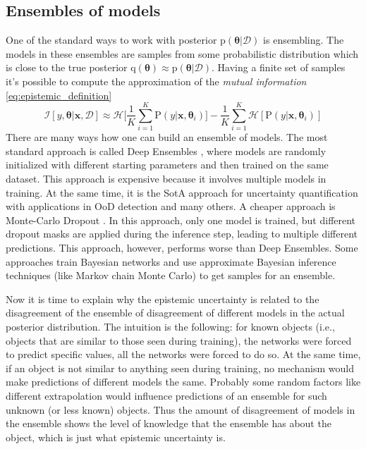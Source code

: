 \documentclass{article}
\begin{document}
\subsection{Ensembles of models}
One of the standard ways to work with posterior $\mathrm{p} (\boldsymbol{\theta} | \mathcal{D})$ is ensembling.
The models in these ensembles are samples from some probabilistic distribution which is close to the true posterior $\mathrm{q} (\boldsymbol{\theta}) \approx \mathrm{p} (\boldsymbol{\theta} | \mathcal{D})$. Having a finite set of samples it's possible to compute the approximation of the \textit{mutual information} \eqref{eq:epistemic_definition}
\begin{equation}
\mathcal{I}[ y, \boldsymbol{\theta} | \boldsymbol{x}, \mathcal{D} ] \approx \mathcal{H} \Bigg[ \frac{1}{K} \sum\limits_{i=1}^K \mathrm{P} (y | \boldsymbol{x}, \boldsymbol{\theta}_i) \Bigg] - \frac{1}{K} \sum\limits_{i=1}^K \mathcal{H} [ \mathrm{P}(y | \boldsymbol{x}, \boldsymbol{\theta}_i) ]
\end{equation}
There are many ways how one can build an ensemble of models.
The most standard approach is called Deep Ensembles \cite{deep_ensembles}, where models are randomly initialized with different starting parameters and then trained on the same dataset.
This approach is expensive because it involves multiple models in training.
At the same time, it is the SotA approach for uncertainty quantification with applications in OoD detection and many others.
A cheaper approach is Monte-Carlo Dropout \cite{monte_carlo_dropout}.
In this approach, only one model is trained, but different dropout masks are applied during the inference step, leading to multiple different predictions.
This approach, however, performs worse than Deep Ensembles.
Some approaches train Bayesian networks and use approximate Bayesian inference techniques (like Markov chain Monte Carlo) to get samples for an ensemble.

Now it is time to explain why the epistemic uncertainty is related to the disagreement of the ensemble of disagreement of different models in the actual posterior distribution.
The intuition is the following: for known objects (i.e., objects that are similar to those seen during training), the networks were forced to predict specific values, all the networks were forced to do so.
At the same time, if an object is not similar to anything seen during training, no mechanism would make predictions of different models the same.
Probably some random factors like different extrapolation would influence predictions of an ensemble for such unknown (or less known) objects.
Thus the amount of disagreement of models in the ensemble shows the level of knowledge that the ensemble has about the object, which is just what epistemic uncertainty is.
\end{document}
